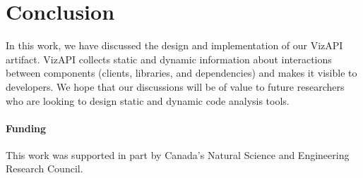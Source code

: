 \section{Conclusion}
In this work, we have discussed the design and implementation of our
VizAPI artifact. VizAPI collects static and dynamic information
about interactions between components (clients, libraries, and dependencies) and makes
it visible to developers. We hope that our discussions will be of value
to future researchers who are looking to design static and dynamic
code analysis tools.

\paragraph{Funding} This work was supported in part by Canada's Natural Science and Engineering Research Council.

